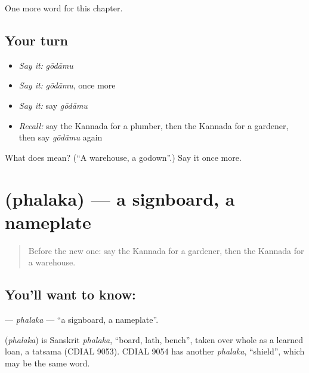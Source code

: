 \begin{grammarlens}[title={What you've built}]
One more word for this chapter.
\end{grammarlens}

\subsection*{Your turn}
\begin{itemize}
\raggedright
  \item \emph{Say it:} \emph{gōdāmu}
  \item \emph{Say it:} \emph{gōdāmu}, once more
  \item \emph{Say it:} say \emph{gōdāmu}
  \item \emph{Recall:} say the Kannada for a plumber, then the Kannada for a gardener, then say \emph{gōdāmu} again
\end{itemize}

\begin{tcolorbox}[breakable,colback=teal!4,colframe=teal!35!black,title={Before you move on}]
What does  mean? (\textquotedblleft{}A warehouse, a godown\textquotedblright{}.) Say it once more.
\end{tcolorbox}
\section[\texorpdfstring{\kn{ಫಲಕ} (phalaka)}{ಫಲಕ (phalaka)}]{ (phalaka) — a signboard, a nameplate}

\label{lesson:KA-C307-phalaka}



\begin{quote}
Before the new one: say the Kannada for a gardener, then the Kannada for a warehouse.
\end{quote}

\subsection*{You'll want to know: }
\textbf{} — \emph{phalaka} — \textquotedblleft{}a signboard, a nameplate\textquotedblright{}.

\begin{cousinweb}
\textbf{} (\emph{phalaka}) is Sanskrit \emph{phalaka}, \textquotedblleft{}board, lath, bench\textquotedblright{}, taken over whole as a learned loan, a tatsama (CDIAL 9053). CDIAL 9054 has another \emph{phalaka}, \textquotedblleft{}shield\textquotedblright{}, which may be the same word.
\end{cousinweb}

